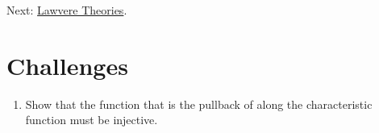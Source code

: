 Next:
\href{https://bartoszmilewski.com/2017/08/26/lawvere-theories/}{Lawvere
Theories}.

\section{Challenges}\label{challenges}

\begin{enumerate}
\tightlist
\item
  Show that the function  that is the pullback of
   along the characteristic function must be injective.
\end{enumerate}
